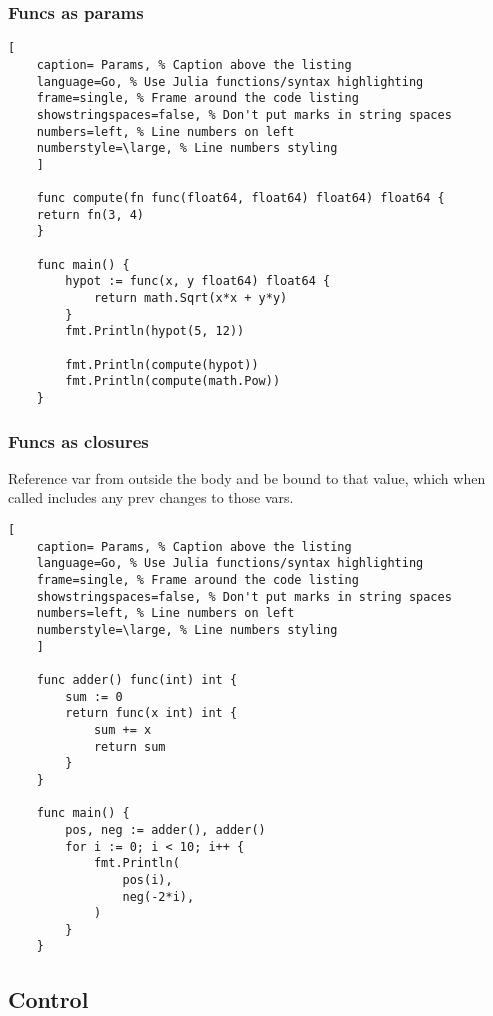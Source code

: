\documentclass[11pt]{scrartcl} %
\begin{document}
\subsubsection{Funcs as params}

\begin{lstlisting}[
	caption= Params, % Caption above the listing
	language=Go, % Use Julia functions/syntax highlighting
	frame=single, % Frame around the code listing
	showstringspaces=false, % Don't put marks in string spaces
	numbers=left, % Line numbers on left
	numberstyle=\large, % Line numbers styling
	]

	func compute(fn func(float64, float64) float64) float64 {
	return fn(3, 4)
	}

	func main() {
		hypot := func(x, y float64) float64 {
			return math.Sqrt(x*x + y*y)
		}
		fmt.Println(hypot(5, 12))

		fmt.Println(compute(hypot))
		fmt.Println(compute(math.Pow))
	}

\end{lstlisting}

\subsubsection{Funcs as closures}

Reference var from outside the body and be bound to that value, which when called
includes any prev changes to those vars.

\begin{lstlisting}[
	caption= Params, % Caption above the listing
	language=Go, % Use Julia functions/syntax highlighting
	frame=single, % Frame around the code listing
	showstringspaces=false, % Don't put marks in string spaces
	numbers=left, % Line numbers on left
	numberstyle=\large, % Line numbers styling
	]

	func adder() func(int) int {
		sum := 0
		return func(x int) int {
			sum += x
			return sum
		}
	}
	
	func main() {
		pos, neg := adder(), adder()
		for i := 0; i < 10; i++ {
			fmt.Println(
				pos(i),
				neg(-2*i),
			)
		}
	}

\end{lstlisting}

\subsection{Control}
\end{document}
